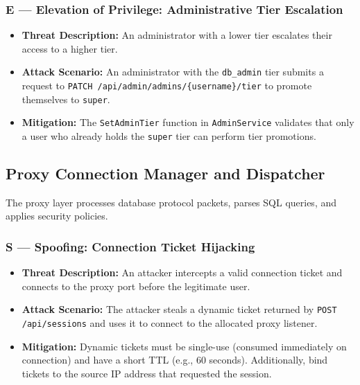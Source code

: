 \subsubsection{E --- Elevation of Privilege: Administrative Tier Escalation}
\begin{itemize}[leftmargin=*]
    \item \textbf{Threat Description:} An administrator with a lower tier escalates their access to a higher tier.
    \item \textbf{Attack Scenario:} An administrator with the \texttt{db\_admin} tier submits a request to \texttt{PATCH /api/admin/admins/\{username\}/tier} to promote themselves to \texttt{super}.
    \item \textbf{Mitigation:} The \texttt{SetAdminTier} function in \texttt{AdminService} validates that only a user who already holds the \texttt{super} tier can perform tier promotions.
\end{itemize}

\subsection{Proxy Connection Manager and Dispatcher}

The proxy layer processes database protocol packets, parses SQL queries, and applies security policies.

\subsubsection{S --- Spoofing: Connection Ticket Hijacking}
\begin{itemize}[leftmargin=*]
    \item \textbf{Threat Description:} An attacker intercepts a valid connection ticket and connects to the proxy port before the legitimate user.
    \item \textbf{Attack Scenario:} The attacker steals a dynamic ticket returned by \texttt{POST /api/sessions} and uses it to connect to the allocated proxy listener.
    \item \textbf{Mitigation:} Dynamic tickets must be single-use (consumed immediately on connection) and have a short TTL (e.g., 60 seconds). Additionally, bind tickets to the source IP address that requested the session.
\end{itemize}

